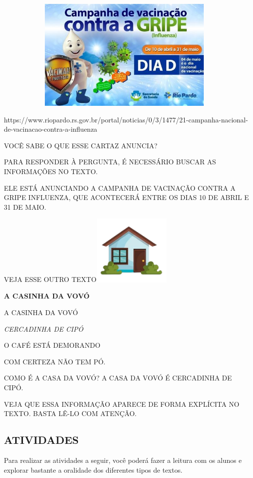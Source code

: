 \includegraphics[width=5.14986in,height=2.17762in]{media/image124.jpg}

https://www.riopardo.rs.gov.br/portal/noticias/0/3/1477/21-campanha-nacional-de-vacinacao-contra-a-influenza

VOCÊ SABE O QUE ESSE CARTAZ ANUNCIA?

PARA RESPONDER À PERGUNTA, É NECESSÁRIO BUSCAR AS INFORMAÇÕES NO TEXTO.

ELE ESTÁ ANUNCIANDO A CAMPANHA DE VACINAÇÃO CONTRA A GRIPE INFLUENZA, QUE
ACONTECERÁ ENTRE OS DIAS 10 DE ABRIL E 31 DE MAIO.

VEJA ESSE OUTRO
TEXTO\includegraphics[width=1.50833in,height=1.35903in]{media/image125.jpg}

\textbf{A CASINHA DA VOVÓ}

A CASINHA DA VOVÓ

\emph{CERCADINHA DE CIPÓ}

O CAFÉ ESTÁ DEMORANDO

COM CERTEZA NÃO TEM PÓ.

COMO É A CASA DA VOVÓ? A CASA DA VOVÓ É CERCADINHA DE CIPÓ.

VEJA QUE ESSA INFORMAÇÃO APARECE DE FORMA EXPLÍCITA NO TEXTO. BASTA LÊ-LO COM ATENÇÃO.

\subsection{ATIVIDADES}\label{atividades-2}

Para realizar as atividades a seguir, você poderá fazer a leitura com os
alunos e explorar bastante a oralidade dos diferentes tipos de textos.

